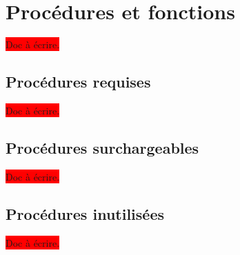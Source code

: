 




\chapter{Procédures et fonctions}

\colorbox{red}{Doc à écrire.}


\section{Procédures requises}

\colorbox{red}{Doc à écrire.}


\section{Procédures surchargeables}

\colorbox{red}{Doc à écrire.}


\section{Procédures inutilisées}

\colorbox{red}{Doc à écrire.}


